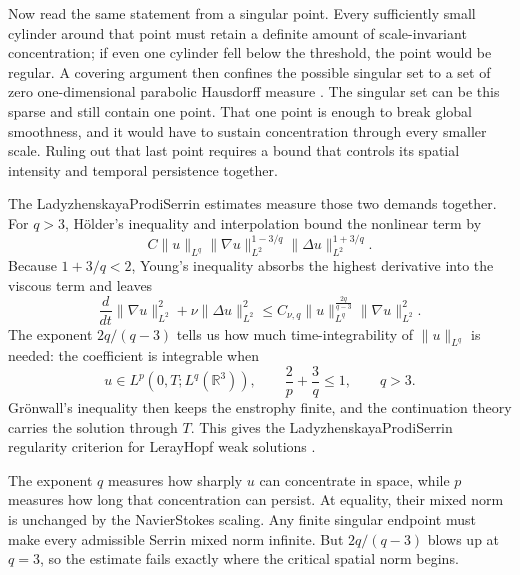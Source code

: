 Now read the same statement from a singular point.
Every sufficiently small cylinder around that point must retain a definite amount of scale-invariant concentration; if even one cylinder fell below the threshold, the point would be regular.
A covering argument then confines the possible singular set to a set of zero one-dimensional parabolic Hausdorff measure \parencite{CaffarelliKohnNirenberg1982}.
The singular set can be this sparse and still contain one point.
That one point is enough to break global smoothness, and it would have to sustain concentration through every smaller scale.
Ruling out that last point requires a bound that controls its spatial intensity and temporal persistence together.


The Ladyzhenskaya\textendash Prodi\textendash Serrin estimates measure those two demands together.
For \(q>3\), H\"older's inequality and interpolation bound the nonlinear term by
\[
  C\lVert u\rVert_{L^q}
  \lVert\nabla u\rVert_{L^2}^{1-3/q}
  \lVert\Delta u\rVert_{L^2}^{1+3/q}.
\]
Because \(1+3/q<2\), Young's inequality absorbs the highest derivative into the viscous term and leaves
\[
  \frac{d}{dt}\lVert\nabla u\rVert_{L^2}^{2}
  +\nu\lVert\Delta u\rVert_{L^2}^{2}
  \leq
  C_{\nu,q}\lVert u\rVert_{L^q}^{\frac{2q}{q-3}}
  \lVert\nabla u\rVert_{L^2}^{2}.
\]
The exponent \(2q/(q-3)\) tells us how much time-integrability of \(\lVert u\rVert_{L^q}\) is needed: the coefficient is integrable when
\begin{equation}\label{eq:HistoricalLPSCriterion}
  u\in L^p(0,T;L^q(\mathbb R^3)),
  \qquad
  \frac{2}{p}+\frac{3}{q}\leq1,
  \qquad
  q>3.
\end{equation}
Gr\"onwall's inequality then keeps the enstrophy finite, and the continuation theory carries the solution through \(T\).
This gives the Ladyzhenskaya\textendash Prodi\textendash Serrin regularity criterion for Leray\textendash Hopf weak solutions \parencite{Prodi1959,Serrin1963,Ladyzhenskaya1967}.

The exponent \(q\) measures how sharply \(u\) can concentrate in space, while \(p\) measures how long that concentration can persist.
At equality, their mixed norm is unchanged by the Navier\textendash Stokes scaling.
Any finite singular endpoint must make every admissible Serrin mixed norm infinite.
But \(2q/(q-3)\) blows up at \(q=3\), so the estimate fails exactly where the critical spatial norm begins.


